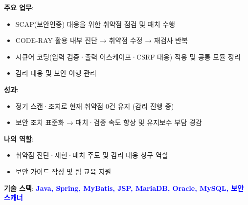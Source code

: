 \documentclass[a4paper,11pt]{article}
\newcommand{\tech}[1]{\textbf{\textcolor{blue}{#1}}}
\begin{document}
\textbf{주요 업무}:
\begin{itemize}[leftmargin=*]
  \item SCAP(보안인증) 대응을 위한 취약점 점검 및 패치 수행
  \item CODE-RAY 활용 내부 진단 → 취약점 수정 → 재검사 반복
  \item 시큐어 코딩(입력 검증·출력 이스케이프·CSRF 대응) 적용 및 공통 모듈 정리
  \item 감리 대응 및 보안 이행 관리
\end{itemize}

\textbf{성과}:
\begin{itemize}[leftmargin=*]
  \item 정기 스캔·조치로 현재 취약점 0건 유지 (감리 진행 중)
  \item 보안 조치 표준화 → 패치·검증 속도 향상 및 유지보수 부담 경감
\end{itemize}

\textbf{나의 역할}:
\begin{itemize}[leftmargin=*]
  \item 취약점 진단·재현·패치 주도 및 감리 대응 창구 역할
  \item 보안 가이드 작성 및 팀 교육 지원
\end{itemize}

\textbf{기술 스택}: \tech{Java, Spring, MyBatis, JSP, MariaDB, Oracle, MySQL, 보안 스캐너}
\end{document}
